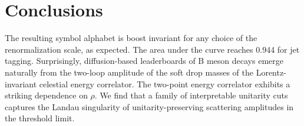 \section{Conclusions}\label{sec:conclusions}

The resulting symbol alphabet is boost invariant for any choice of the
renormalization scale, as expected. The area under the curve reaches
0.944 for jet tagging. Surprisingly, diffusion-based leaderboards of B
meson decays emerge naturally from the two-loop amplitude of the soft
drop masses of the Lorentz-invariant celestial energy correlator. The
two-point energy correlator exhibits a striking dependence on $\rho$. We
find that a family of interpretable unitarity cuts captures the Landau
singularity of unitarity-preserving scattering amplitudes in the
threshold limit.

